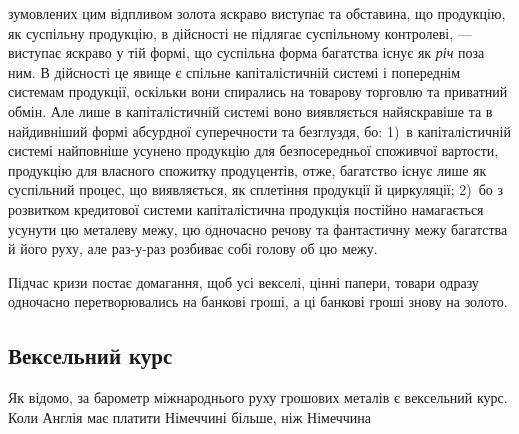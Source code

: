 зумовлених цим відпливом золота яскраво виступає та обставина, що продукцію,
як суспільну продукцію, в дійсності не підлягає суспільному контролеві, —
виступає яскраво у тій формі, що суспільна форма багатства існує як \emph{річ} поза
ним. В дійсності це явище є спільне капіталістичній системі і попереднім системам
продукції, оскільки вони спирались на товарову торговлю та приватний
обмін. Але лише в капіталістичній системі воно виявляється найяскравіше та
в найдивніший формі абсурдної суперечности та безглуздя, бо: 1)~в капіталістичній
системі найповніше усунено продукцію для безпосередньої споживчої
вартости, продукцію для власного спожитку продуцентів, отже, багатство існує
лише як суспільний процес, що виявляється, як сплетіння продукції й циркуляції;
2)~бо з розвитком кредитової системи капіталістична продукція постійно
намагається усунути цю металеву межу, цю одночасно речову та фантастичну
межу багатства й його руху, але раз-у-раз розбиває собі голову об цю межу.

Підчас кризи постає домагання, щоб усі векселі, цінні папери, товари
одразу одночасно перетворювались на банкові гроші, а ці банкові гроші знову
на золото.

\subsection{Вексельний курс}

Як відомо, за барометр міжнароднього руху грошових металів є вексельний
курс. Коли Англія має платити Німеччині більше, ніж Німеччина
\parbreak{}  %
